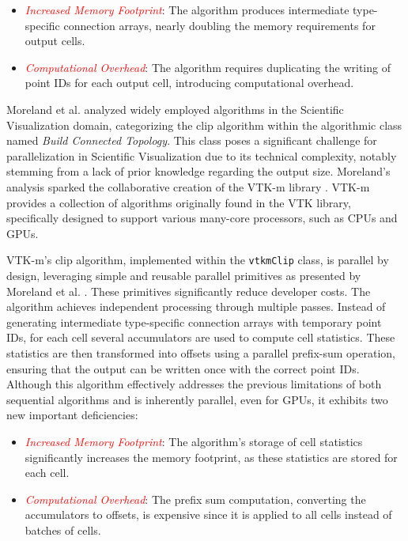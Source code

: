 \documentclass{egpubl}
\newcommand*{\fix}[1]{\textcolor{red}{#1}}
\begin{document}
\begin{itemize}
    \item \fix{\textit{Increased Memory Footprint}}: The algorithm produces intermediate type-specific connection arrays, nearly doubling the memory requirements for output cells.
    \item \fix{\textit{Computational Overhead}}: The algorithm requires duplicating the writing of point IDs for each output cell, introducing computational overhead.
\end{itemize}

Moreland et al. \cite{ClassSciViz} analyzed widely employed algorithms in the Scientific Visualization domain, categorizing the clip algorithm within the algorithmic class named \textit{Build Connected Topology}. This class poses a significant challenge for parallelization in Scientific Visualization due to its technical complexity, notably stemming from a lack of prior knowledge regarding the output size. Moreland's analysis sparked the collaborative creation of the VTK-m library \cite{VTKm}. VTK-m provides a collection of algorithms originally found in the VTK library, specifically designed to support various many-core processors, such as CPUs and GPUs.

VTK-m's clip algorithm, implemented within the \texttt{vtkmClip} class, is parallel by design, leveraging simple and reusable parallel primitives as presented by Moreland et al. \cite{MCD3}. These primitives significantly reduce developer costs. The algorithm achieves independent processing through multiple passes. Instead of generating intermediate type-specific connection arrays with temporary point IDs, for each cell several accumulators are used to compute cell statistics. These statistics are then transformed into offsets using a parallel prefix-sum operation, ensuring that the output can be written once with the correct point IDs. Although this algorithm effectively addresses the previous limitations of both sequential algorithms and is inherently parallel, even for GPUs, it exhibits two new important deficiencies:

\begin{itemize}
    \item \fix{\textit{Increased Memory Footprint}}: The algorithm's storage of cell statistics significantly increases the memory footprint, as these statistics are stored for each cell.
    \item \fix{\textit{Computational Overhead}}: The prefix sum computation, converting the accumulators to offsets, is expensive since it is applied to all cells instead of batches of cells. 
\end{itemize}
\end{document}
